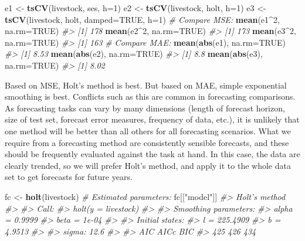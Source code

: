 \documentclass[]{book}
\newenvironment{Shaded}{\begin{snugshade}}{\end{snugshade}}
\newcommand{\CommentTok}[1]{\textcolor[rgb]{0.56,0.35,0.01}{\textit{#1}}}
\newcommand{\DataTypeTok}[1]{\textcolor[rgb]{0.13,0.29,0.53}{#1}}
\newcommand{\DecValTok}[1]{\textcolor[rgb]{0.00,0.00,0.81}{#1}}
\newcommand{\KeywordTok}[1]{\textcolor[rgb]{0.13,0.29,0.53}{\textbf{#1}}}
\newcommand{\NormalTok}[1]{#1}
\newcommand{\OperatorTok}[1]{\textcolor[rgb]{0.81,0.36,0.00}{\textbf{#1}}}
\newcommand{\OtherTok}[1]{\textcolor[rgb]{0.56,0.35,0.01}{#1}}
\newcommand{\StringTok}[1]{\textcolor[rgb]{0.31,0.60,0.02}{#1}}
\begin{document}
\begin{Shaded}
\begin{Highlighting}[]
\NormalTok{e1 <-}\StringTok{ }\KeywordTok{tsCV}\NormalTok{(livestock, ses, }\DataTypeTok{h=}\DecValTok{1}\NormalTok{)}
\NormalTok{e2 <-}\StringTok{ }\KeywordTok{tsCV}\NormalTok{(livestock, holt, }\DataTypeTok{h=}\DecValTok{1}\NormalTok{)}
\NormalTok{e3 <-}\StringTok{ }\KeywordTok{tsCV}\NormalTok{(livestock, holt, }\DataTypeTok{damped=}\OtherTok{TRUE}\NormalTok{, }\DataTypeTok{h=}\DecValTok{1}\NormalTok{)}
\CommentTok{# Compare MSE:}
\KeywordTok{mean}\NormalTok{(e1}\OperatorTok{^}\DecValTok{2}\NormalTok{, }\DataTypeTok{na.rm=}\OtherTok{TRUE}\NormalTok{)}
\CommentTok{#> [1] 178}
\KeywordTok{mean}\NormalTok{(e2}\OperatorTok{^}\DecValTok{2}\NormalTok{, }\DataTypeTok{na.rm=}\OtherTok{TRUE}\NormalTok{)}
\CommentTok{#> [1] 173}
\KeywordTok{mean}\NormalTok{(e3}\OperatorTok{^}\DecValTok{2}\NormalTok{, }\DataTypeTok{na.rm=}\OtherTok{TRUE}\NormalTok{)}
\CommentTok{#> [1] 163}
\CommentTok{# Compare MAE:}
\KeywordTok{mean}\NormalTok{(}\KeywordTok{abs}\NormalTok{(e1), }\DataTypeTok{na.rm=}\OtherTok{TRUE}\NormalTok{)}
\CommentTok{#> [1] 8.53}
\KeywordTok{mean}\NormalTok{(}\KeywordTok{abs}\NormalTok{(e2), }\DataTypeTok{na.rm=}\OtherTok{TRUE}\NormalTok{)}
\CommentTok{#> [1] 8.8}
\KeywordTok{mean}\NormalTok{(}\KeywordTok{abs}\NormalTok{(e3), }\DataTypeTok{na.rm=}\OtherTok{TRUE}\NormalTok{)}
\CommentTok{#> [1] 8.02}
\end{Highlighting}
\end{Shaded}

Based on MSE, Holt's method is best. But based on MAE, simple exponential smoothing is best. Conflicts such as this are common in forecasting comparisons. As forecasting tasks can vary by many dimensions (length of forecast horizon, size of test set, forecast error measures, frequency of data, etc.), it is unlikely that one method will be better than all others for all forecasting scenarios. What we require from a forecasting method are consistently sensible forecasts, and these should be frequently evaluated against the task at hand. In this case, the data are clearly trended, so we will prefer Holt's method, and apply it to the whole data set to get forecasts for future years.

\begin{Shaded}
\begin{Highlighting}[]
\NormalTok{fc <-}\StringTok{ }\KeywordTok{holt}\NormalTok{(livestock)}
\CommentTok{# Estimated parameters:}
\NormalTok{fc[[}\StringTok{"model"}\NormalTok{]]}
\CommentTok{#> Holt's method }
\CommentTok{#> }
\CommentTok{#> Call:}
\CommentTok{#>  holt(y = livestock) }
\CommentTok{#> }
\CommentTok{#>   Smoothing parameters:}
\CommentTok{#>     alpha = 0.9999 }
\CommentTok{#>     beta  = 1e-04 }
\CommentTok{#> }
\CommentTok{#>   Initial states:}
\CommentTok{#>     l = 225.4909 }
\CommentTok{#>     b = 4.9513 }
\CommentTok{#> }
\CommentTok{#>   sigma:  12.6}
\CommentTok{#> }
\CommentTok{#>  AIC AICc  BIC }
\CommentTok{#>  425  426  434}
\end{Highlighting}
\end{Shaded}
\end{document}
